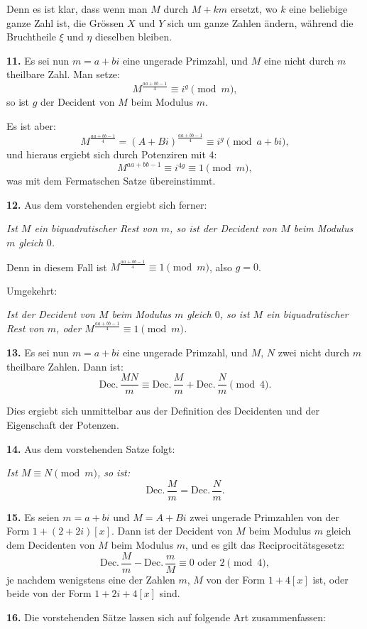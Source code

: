 \documentclass[12pt,a4paper]{article}
\begin{document}
Denn es ist klar, dass wenn man $M$ durch $M + km$ ersetzt, wo $k$ eine beliebige ganze Zahl
ist, die Grössen $X$ und $Y$ sich um ganze Zahlen ändern, während die Bruchtheile $\xi$ und $\eta$
dieselben bleiben.

\textbf{11.} Es sei nun $m = a + bi$ eine ungerade Primzahl, und $M$ eine nicht durch $m$ theilbare
Zahl. Man setze:
\[
M^{\frac{aa + bb - 1}{4}} \equiv i^g \pmod{m},
\]
so ist $g$ der Decident von $M$ beim Modulus $m$.

Es ist aber:
\[
M^{\frac{aa + bb - 1}{4}} = (A + Bi)^{\frac{aa + bb - 1}{4}} \equiv i^g \pmod{a + bi},
\]
und hieraus ergiebt sich durch Potenziren mit $4$:
\[
M^{aa + bb - 1} \equiv i^{4g} \equiv 1 \pmod{m},
\]
was mit dem Fermatschen Satze übereinstimmt.

\textbf{12.} Aus dem vorstehenden ergiebt sich ferner:

\textit{Ist $M$ ein biquadratischer Rest von $m$, so ist der Decident von $M$ beim Modulus $m$ gleich $0$.}

Denn in diesem Fall ist $M^{\frac{aa + bb - 1}{4}} \equiv 1 \pmod{m}$, also $g = 0$.

Umgekehrt:

\textit{Ist der Decident von $M$ beim Modulus $m$ gleich $0$, so ist $M$ ein biquadratischer Rest von $m$, 
oder $M^{\frac{aa + bb - 1}{4}} \equiv 1 \pmod{m}$.}

\textbf{13.} Es sei nun $m = a + bi$ eine ungerade Primzahl, und $M$, $N$ zwei nicht durch $m$
theilbare Zahlen. Dann ist:
\[
\text{Dec.}\,\frac{MN}{m} \equiv \text{Dec.}\,\frac{M}{m} + \text{Dec.}\,\frac{N}{m} \pmod{4}.
\]

Dies ergiebt sich unmittelbar aus der Definition des Decidenten und der Eigenschaft der
Potenzen.

\textbf{14.} Aus dem vorstehenden Satze folgt:

\textit{Ist $M \equiv N \pmod{m}$, so ist:}
\[
\text{Dec.}\,\frac{M}{m} = \text{Dec.}\,\frac{N}{m}.
\]

\textbf{15.} Es seien $m = a + bi$ und $M = A + Bi$ zwei ungerade Primzahlen von der Form
$1 + (2 + 2i)[x]$. Dann ist der Decident von $M$ beim Modulus $m$ gleich dem Decidenten von
$M$ beim Modulus $m$, und es gilt das Reciprocitätsgesetz:
\[
\text{Dec.}\,\frac{M}{m} - \text{Dec.}\,\frac{m}{M} \equiv 0 \text{ oder } 2 \pmod{4},
\]
je nachdem wenigstens eine der Zahlen $m$, $M$ von der Form $1 + 4[x]$ ist, oder beide von der
Form $1 + 2i + 4[x]$ sind.


\textbf{16.} Die vorstehenden Sätze lassen sich auf folgende Art zusammenfassen:
\end{document}
